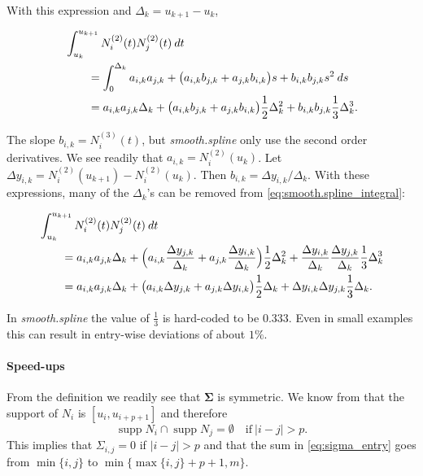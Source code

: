\documentclass[a4paper]{scrartcl}
\newcommand{\mat}[1]{\ensuremath{\bm{#1}}}
\newcommand\dd{\ensuremath{\:d}}
\DeclareMathOperator\supp{supp}
\begin{document}
With this expression and $\Delta_k = u_{k+1} - u_k$,

\begin{align}
    \MoveEqLeft
    \int_{u_k}^{u_{k+1}} N_i^{(2)}(t) N_j^{(2)}(t) \dd t 
    \nonumber
    \\
    & = \int_0^{\Delta_k} a_{i,k} a_{j,k} + \bigl(a_{i,k} b_{j,k} + a_{j,k} b_{i,k}\bigr) s + b_{i,k} b_{j,k} s^2 \dd s 
    \nonumber
    \\
    & = a_{i,k} a_{j,k} \Delta_k + \bigl(a_{i,k} b_{j,k} + a_{j,k} b_{i,k}\bigr) \frac12 \Delta_k^2 + b_{i,k} b_{j,k} \frac13 \Delta_k^3.
    \label{eq:smooth.spline_integral}
\end{align}

The slope $b_{i,k} = N_i^{(3)}(t)$, but \textit{smooth.spline} only use the second order derivatives.
We see readily that $a_{i,k} = N_i^{(2)}(u_k)$.
Let $\Delta y_{i,k} = N_i^{(2)}(u_{k+1}) - N_i^{(2)}(u_k)$.
Then $b_{i,k} = \Delta y_{i,k} / \Delta_k$.
With these expressions, many of the $\Delta_k$'s can be removed from \cref{eq:smooth.spline_integral}:

\begin{align*}
    \MoveEqLeft
    \int_{u_k}^{u_{k+1}} N_i^{(2)}(t) N_j^{(2)}(t) \dd t 
    \\
    & = a_{i,k} a_{j,k} \Delta_k + \Bigl(a_{i,k} \frac{\Delta y_{j,k}}{\Delta_k} + a_{j,k} \frac{\Delta y_{i,k}}{\Delta_k}\Bigr) \frac12 \Delta_k^2 + \frac{\Delta y_{i,k}}{\Delta_k} \frac{\Delta y_{j,k}}{\Delta_k} \frac13 \Delta_k^3
    \\
    & = a_{i,k} a_{j,k} \Delta_k + \bigl(a_{i,k} \Delta y_{j,k} + a_{j,k} \Delta y_{i,k}\bigr) \frac12 \Delta_k + \Delta y_{i,k} \Delta y_{j,k} \frac13 \Delta_k.
\end{align*}

In \textit{smooth.spline} the value of $\tfrac13$ is hard-coded to be $0.333$.
Even in small examples this can result in entry-wise deviations of about $1\%$.


\paragraph{Speed-ups}

From the definition we readily see that $\mat\Sigma$ is symmetric.
We know from \cite[P2.1]{Piegl:Tiller:1997} that the support of $N_i$ is $[u_i, u_{i+p+1}]$ and therefore 
\begin{equation*}
    \supp N_i \cap \supp N_j = \emptyset
    \quad\text{if}\:
    |i - j| > p.
\end{equation*}
This implies that $\Sigma_{i,j} = 0$ if $|i - j| > p$ and that the sum in \cref{eq:sigma_entry} goes from $\min\{i, j\}$ to $\min\{\max\{i, j\} + p + 1, m\}$.
\end{document}
